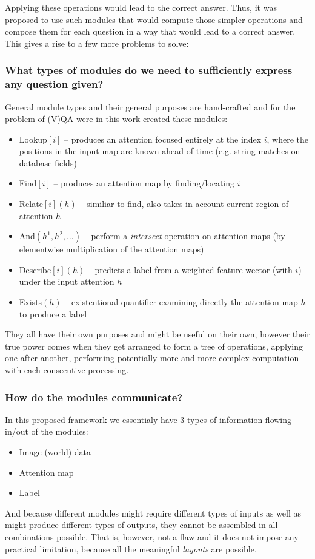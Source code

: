 \documentclass[a4paper]{article}
\begin{document}
\begin{multicols}{2}
Applying these operations would lead to the correct answer. Thus, it was proposed to use such modules that would compute those simpler operations and compose them for each question in a way that would lead to a correct answer. This gives a rise to a few more problems to solve:

\subsubsection*{What types of modules do we need to sufficiently express any question given?}
General module types and their general purposes are hand-crafted and for the problem of (V)QA were in this work created these modules:
    \begin{itemize}
        \item Lookup$[i]$ – produces an attention focused entirely at the index $i$, where the positions in the input map are known ahead of time (e.g. string matches on database fields)
        \item Find$[i]$ – produces an attention map by finding/locating $i$ 
        \item Relate$[i](h)$ – similiar to find, also takes in account current region of attention $h$
        \item And$(h^1, h^2, \dots)$ – perform a \textit{intersect} operation on attention maps (by elementwise multiplication of the attention maps)
        \item Describe$[i](h)$ – predicts a label from a weighted feature wector (with $i$) under the input attention $h$
        \item Exists$(h)$ – existentional quantifier examining directly the attention map $h$ to produce a label
    \end{itemize}
They all have their own purposes and might be useful on their own, however their true
power comes when they get arranged to form a tree of operations, applying one after another, performing potentially more and more complex computation with each consecutive processing.

\subsubsection*{How do the modules communicate?}
In this proposed framework we essentialy have 3 types of information flowing in/out of the modules:
    \begin{itemize}
        \item Image (world) data
        \item Attention map
        \item Label
    \end{itemize}
And because different modules might require different types of inputs as well as might produce different types of outputs, they cannot be assembled in all combinations possible. That is, however, not a flaw and it does not impose any practical limitation, because all the meaningful \textit{layouts} are possible.


\end{multicols}
\end{document}
